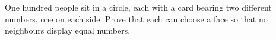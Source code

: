 One hundred people sit in a circle, each with a card bearing two different numbers, one on each side. Prove that each can choose a face so that no neighbours display equal numbers.
